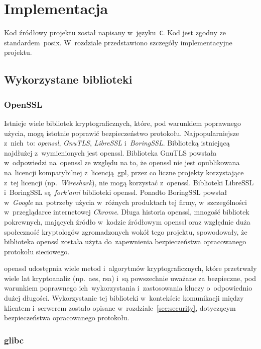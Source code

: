 \documentclass[thesis]{subfiles}
\begin{document}
\chapter{Implementacja}
\label{chapter:implementacja}

Kod źródłowy projektu został napisany w~języku~\texttt{C}. Kod jest zgodny ze standardem~\gls{posix}. W~rozdziale przedstawiono szczegóły implementacyjne projektu.

\section{Wykorzystane biblioteki}
\subsection{OpenSSL}

Istnieje wiele bibliotek kryptograficznych, które, pod warunkiem poprawnego użycia, mogą istotnie poprawić bezpieczeństwo protokołu. Najpopularniejsze z~nich~to: \emph{\gls{openssl}}, \emph{GnuTLS}, \emph{LibreSSL} i~\emph{BoringSSL}. Biblioteką istniejącą najdłużej z~wymienionych jest \gls{openssl}. Biblioteka GnuTLS powstała w~odpowiedzi na~\gls{openssl} ze względu na to, że \gls{openssl} nie jest opublikowana na~licencji kompatybilnej z~licencją~\gls{gpl}, przez co liczne projekty korzystające z~tej licencji (np.~\emph{Wireshark}), nie mogą korzystać z~\gls{openssl}. Biblioteki LibreSSL i~BoringSSL są~\emph{fork'ami} biblioteki \gls{openssl}. Ponadto BoringSSL powstał w~\emph{Google} na~potrzeby użycia w~różnych produktach tej firmy, w~szczególności w~przeglądarce internetowej \emph{Chrome}. Długa historia \gls{openssl}, mnogość bibliotek pokrewnych, mających źródło w~kodzie źródłowym \gls{openssl} oraz względnie duża społeczność kryptologów zgromadzonych wokół tego projektu, spowodowały, że biblioteka \gls{openssl} została użyta do~zapewnienia bezpieczeństwa opracowanego protokołu sieciowego.

\gls{openssl} udostępnia wiele metod i~algorytmów kryptograficznych, które przetrwały wiele lat kryptoanaliz (np.~\gls{aes}, \gls{rsa}) i~są powszechnie uważane za bezpieczne, pod warunkiem poprawnego ich~wykorzystania i~zastosowania kluczy o~odpowiednio dużej długości. Wykorzystanie tej biblioteki w~kontekście komunikacji między klientem i~serwerem zostało opisane w~rozdziale~\ref{sec:security}, dotyczącym bezpieczeństwa opracowanego protokołu.

\subsection{glibc}
\end{document}
